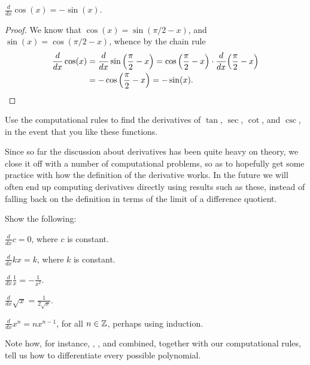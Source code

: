 \begin{corollary}
	$\displaystyle \frac{d}{d x} \cos(x) = - \sin(x)$.
\end{corollary}

\begin{proof}
	We know that $\cos(x) = \sin(\pi/2 - x)$, and $\sin(x) = \cos(\pi/2 - x)$, whence by the chain rule
	\begin{align*}
		\frac{d}{d x} \cos(x) & = \frac{d}{d x} \sin\Big ( \frac{\pi}{2} - x \Big ) = \cos \Big ( \frac{\pi}{2} - x \Big ) \cdot \frac{d}{d x} \Big ( \frac{\pi}{2} - x \Big ) \\
		                      & = - \cos \Big ( \frac{\pi}{2} - x \Big ) = - \sin(x). \qedhere
	\end{align*}
\end{proof}

\begin{exercise}
	Use the computational rules to find the derivatives of $\tan$, $\sec$, $\cot$, and $\csc$, in the event that you like these functions.
\end{exercise}

\noindent
Since so far the discussion about derivatives has been quite heavy on theory, we close it off with a number of computational problems, so as to hopefully get some practice with how the definition of the derivative works. In the future we will often end up computing derivatives directly using results such as these, instead of falling back on the definition in terms of the limit of a difference quotient.

\begin{exercises}
Show the following:
\begin{alphalist}
	\item $\displaystyle \frac{d}{d x} c = 0$, where $c$ is constant.
	\item $\displaystyle \frac{d}{d x} k x = k$, where $k$ is constant.
	\item $\displaystyle \frac{d}{d x} \frac{1}{x} = - \frac{1}{x^2}$.
	\item $\displaystyle \frac{d}{d x} \sqrt{x} = \frac{1}{2 \sqrt{x}}$.
	\item $\displaystyle \frac{d}{d x} x^n = n x^{n - 1}$, for all $n \in \mathbb{Z}$, perhaps using induction.
\end{alphalist}
\end{exercises}

\noindent
Note how, for instance, , , and  combined, together with our computational rules, tell us how to differentiate every possible polynomial.

